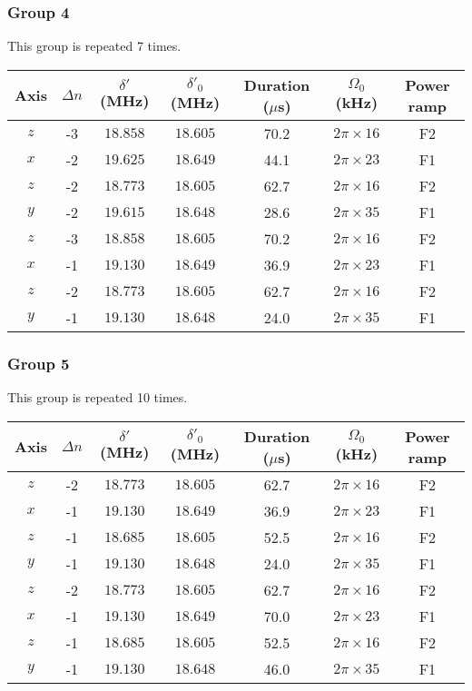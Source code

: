 \newpage
\subsubsection{Group 4}
This group is repeated 7 times.
\begin{center}
  \begin{tabular}{|c|c|c|c|c|c|c|}
    \hline
    Axis&$\Delta n$&$\delta'$ (MHz)&$\delta'_0$ (MHz)&Duration ($\mu$s)& $\Omega_0$ (kHz)&Power ramp\\\hline
    $z$&-3&$18.858$&$18.605$&70.2&$2\pi\times16$&F2\\\hline
    $x$&-2&$19.625$&$18.649$&44.1&$2\pi\times23$&F1\\\hline
    $z$&-2&$18.773$&$18.605$&62.7&$2\pi\times16$&F2\\\hline
    $y$&-2&$19.615$&$18.648$&28.6&$2\pi\times35$&F1\\\hline
    $z$&-3&$18.858$&$18.605$&70.2&$2\pi\times16$&F2\\\hline
    $x$&-1&$19.130$&$18.649$&36.9&$2\pi\times23$&F1\\\hline
    $z$&-2&$18.773$&$18.605$&62.7&$2\pi\times16$&F2\\\hline
    $y$&-1&$19.130$&$18.648$&24.0&$2\pi\times35$&F1\\\hline
  \end{tabular}
\end{center}

\newpage
\subsubsection{Group 5}
This group is repeated 10 times.
\begin{center}
  \begin{tabular}{|c|c|c|c|c|c|c|}
    \hline
    Axis&$\Delta n$&$\delta'$ (MHz)&$\delta'_0$ (MHz)&Duration ($\mu$s)& $\Omega_0$ (kHz)&Power ramp\\\hline
    $z$&-2&$18.773$&$18.605$&62.7&$2\pi\times16$&F2\\\hline
    $x$&-1&$19.130$&$18.649$&36.9&$2\pi\times23$&F1\\\hline
    $z$&-1&$18.685$&$18.605$&52.5&$2\pi\times16$&F2\\\hline
    $y$&-1&$19.130$&$18.648$&24.0&$2\pi\times35$&F1\\\hline
    $z$&-2&$18.773$&$18.605$&62.7&$2\pi\times16$&F2\\\hline
    $x$&-1&$19.130$&$18.649$&70.0&$2\pi\times23$&F1\\\hline
    $z$&-1&$18.685$&$18.605$&52.5&$2\pi\times16$&F2\\\hline
    $y$&-1&$19.130$&$18.648$&46.0&$2\pi\times35$&F1\\\hline
  \end{tabular}
\end{center}

